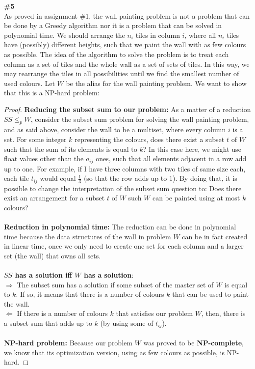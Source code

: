 \documentclass{article}
\begin{document}
\textbf{\#5}
\\
As proved in assignment \#1, the wall painting problem is not a problem that can be done by a Greedy algorithm nor it is a problem that can be solved in polynomial time. We should arrange the $n_i$ tiles in column $i$, where all $n_i$ tiles have (possibly) different heights, such that we paint the wall with as few colours as possible. The idea of the algorithm to solve the problem is to treat each column as a set of tiles and the whole wall as a set of sets of tiles. In this way, we may rearrange the tiles in all possibilities until we find the smallest number of used colours. Let $W$ be the alias for the wall painting problem. We want to show that this is a NP-hard problem:
\\
\begin{proof}
\textbf{Reducing the subset sum to our problem:} As a matter of a reduction $SS \leq_p W$, consider the subset sum problem for solving the wall painting problem, and as said above, consider the wall to be a multiset, where every column $i$ is a set. For some integer $k$ representing the colours, does there exist a subset $t$ of $W$ such that the sum of its elements is equal to $k$? In this case here, we might use float values other than the $a_{ij}$ ones, such that all elements adjacent in a row add up to one. For example, if I have three columns with two tiles of same size each, each tile $t_{ij}$ would equal $\frac{1}{3}$ (so that the row adds up to $1$). By doing that, it is possible to change the interpretation of the subset sum question to: Does there exist an arrangement for a subset $t$ of $W$ such $W$ can be painted using at most $k$ colours?
\\
\\
\textbf{Reduction in polynomial time:}  The reduction can be done in polynomial time because the data structures of the wall in problem $W$ can be in fact created in linear time, once we only need to create one set for each column and a larger set (the wall) that owns all sets.
\\
\\
\textbf{$SS$ has a solution iff $W$ has a solution}:
\\
$\Longrightarrow $ The subset sum has a solution if some subset of the master set of $W$ is equal to $k$. If so, it means that there is a number of colours $k$ that can be used to paint the wall.
\\
$\Longleftarrow $ If there is a number of colours $k$ that satisfies our problem $W$, then, there is a subset sum that adds up to $k$ (by using some of $t_{ij}$).
\\
\\
\textbf{NP-hard problem:} Because our problem $W$ was proved to be \textbf{NP-complete}, we know that its optimization version, using as few colours as possible, is NP-hard.
\end{proof}
\end{document}
